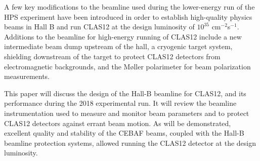 A few key modifications to the beamline \cite{HPSBeamline} used during the lower-energy run of the HPS experiment have been introduced 
in order to establish high-quality physics beams in Hall B and run CLAS12 at the design luminosity of $10^{35}$ cm$^{-2}$s$^{-1}$.  
Additions to the beamline for high-energy running of CLAS12 include a new intermediate beam dump upstream of the hall, a cryogenic 
target system, shielding downstream of the target to protect CLAS12 detectors from electromagnetic backgrounds, and the M{\o}ller 
polarimeter for beam polarization measurements.   


 
This paper will discuss the design of the Hall-B beamline for CLAS12, and its performance during the 2018 experimental run. It will review the 
beamline instrumentation used to measure and monitor beam parameters and to protect CLAS12 detectors against errant beam motion. As will 
be demonstrated, excellent quality and stability of the CEBAF beams, coupled with the Hall-B beamline protection systems, allowed running the 
CLAS12 detector at the design luminosity.



